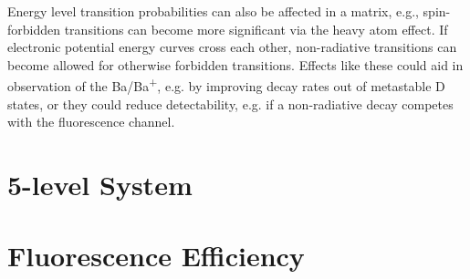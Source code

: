 Energy level transition probabilities can also be affected in a matrix, e.g., spin-forbidden transitions can become more significant via the heavy atom effect.  If electronic potential energy curves cross each other, non-radiative transitions can become allowed for otherwise forbidden transitions. \cite{crepin}  Effects like these could aid in observation of the Ba/Ba\textsuperscript{+}, e.g. by improving decay rates out of metastable D states, or they could reduce detectability, e.g. if a non-radiative decay competes with the fluorescence channel.


\section{5-level System}




\section{Fluorescence Efficiency}

